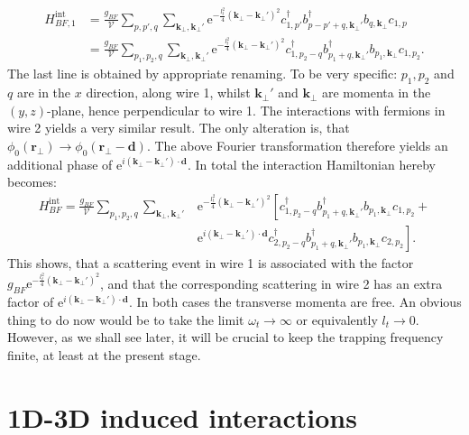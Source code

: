 \begin{align}
H_{BF, 1}^{\text{int}} &= \frac{g_{BF}}{\mathcal{V}}\sum_{p, p', q} \sum_{\mathbf{k}_\perp, \mathbf{k}_\perp'} \text{e}^{-\frac{l_t^2}{4}(\mathbf{k}_\perp-\mathbf{k}_\perp')^2} c^\dagger_{1, p'} b^\dagger_{p - p' + q, \mathbf{k}_\perp'} b_{q, \mathbf{k}_\perp}c_{1, p} \nonumber \\
                  &= \frac{g_{BF}}{\mathcal{V}}\sum_{p_1, p_2, q} \sum_{\mathbf{k}_\perp, \mathbf{k}_\perp'} \text{e}^{-\frac{l_t^2}{4}(\mathbf{k}_\perp-\mathbf{k}_\perp')^2} c_{1, p_2 - q}^\dagger b_{p_1 + q, \mathbf{k}_\perp'}^\dagger b_{p_1, \mathbf{k}_\perp}c_{1, p_2}.
\end{align}
The last line is obtained by appropriate renaming. To be very specific: $p_1, p_2$ and $q$ are in the $x$ direction, along wire 1, whilst $\mathbf{k}_\perp'$ and $\mathbf{k}_\perp$ are momenta in the $(y,z)$-plane, hence perpendicular to wire 1. The interactions with fermions in wire 2 yields a very similar result. The only alteration is, that $\phi_0(\mathbf{r}_\perp) \to \phi_0(\mathbf{r}_\perp - \mathbf{d})$. The above Fourier transformation therefore yields an additional phase of $\text{e}^{i(\mathbf{k}_\perp - \mathbf{k}_\perp')\cdot \mathbf{d}}$. In total the interaction Hamiltonian hereby becomes:
\begin{align}
H_{BF}^\text{int} = \frac{g_{BF}}{\mathcal{V}}\sum_{p_1,p_2,q} \sum_{\mathbf{k}_\perp, \mathbf{k}_\perp'} & \text{e}^{-\frac{l_t^2}{4}(\mathbf{k}_\perp - \mathbf{k}_\perp')^2}\left[ c^\dagger_{1,p_2-q} b^\dagger_{p_1+q, \mathbf{k}_\perp'} b_{p_1,\mathbf{k}_\perp}c_{1,p_2} + \right. \nonumber \\
& \left. \text{e}^{i(\mathbf{k}_\perp - \mathbf{k}_\perp')\cdot \mathbf{d}}c_{2,p_2-q}^\dagger b_{p_1+q, \mathbf{k}_\perp'}^\dagger b_{p_1,\mathbf{k}_\perp}c_{2,p_2} \right].
\end{align}
This shows, that a scattering event in wire 1 is associated with the factor $g_{BF} \text{e}^{-\frac{l_t^2}{4}(\mathbf{k}_\perp - \mathbf{k}_\perp')^2}$, and that the corresponding scattering in wire 2 has an extra factor of $\text{e}^{i(\mathbf{k}_\perp - \mathbf{k}_\perp')\cdot \mathbf{d}}$. In both cases the transverse momenta are free. An obvious thing to do now would be to take the limit $\omega_t \to \infty$ or equivalently $l_t \to 0$. However, as we shall see later, it will be crucial to keep the trapping frequency finite, at least at the present stage.  

\section{1D-3D induced interactions} \label{sec.1D3Dinducedinteraction}
